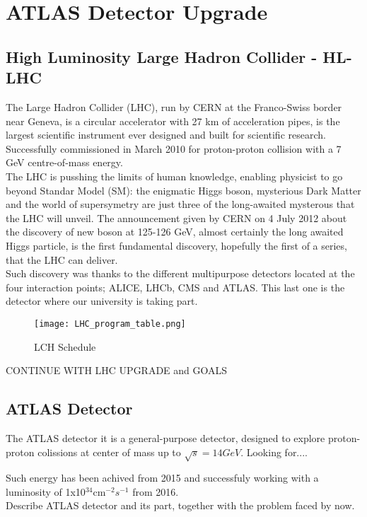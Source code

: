 \section{ATLAS Detector Upgrade}

\subsection{High Luminosity Large Hadron Collider - HL-LHC}
The Large Hadron Collider (LHC), run by CERN at the Franco-Swiss border near Geneva, is a circular accelerator with 27 km of acceleration pipes, is the largest scientific instrument ever designed and built for scientific research. Successfully commissioned in March 2010 for proton-proton collision with a 7 GeV centre-of-mass energy.\\
The LHC is pusshing the limits of human knowledge, enabling physicist to go beyond Standar Model (SM): the enigmatic Higgs boson, mysterious Dark Matter and the world of supersymetry are just three of the long-awaited mysterous that the LHC will unveil. The announcement given by CERN on 4 July 2012 about the discovery of new boson at 125-126 GeV, almost certainly the long awaited Higgs particle, is the first fundamental discovery, hopefully the first of a series, that the LHC can deliver.\\
Such discovery was thanks to the different multipurpose detectors located at the four interaction points; ALICE, LHCb, CMS and ATLAS. This last one is the detector where our university is taking part.\\
\begin{figure}[ht]
		\centering
		\texttt{[image: LHC\_program\_table.png]}
		\caption{LCH Schedule}\label{fig:a}
\end{figure}
\par
CONTINUE WITH LHC UPGRADE and GOALS

\subsection{ATLAS Detector}
The ATLAS detector it is a general-purpose detector, designed to explore proton-proton colissions at center of mass up to $\sqrt{s}=14GeV$. Looking for.... \par
Such energy has been achived from 2015 and successfuly working with a luminosity of 1x10$^{34}$cm$^{-2}s^{-1}$ from 2016.\\

Describe ATLAS detector and its part, together with the problem faced by now.\par


